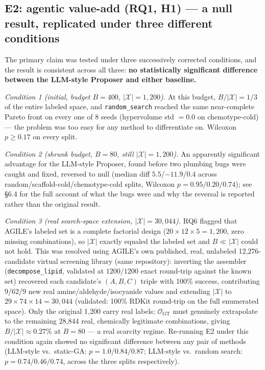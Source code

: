 \documentclass{article}
\begin{document}
\subsection{E2: agentic value-add (RQ1, H1) --- a null result, replicated
under three different conditions}

The primary claim was tested under three successively corrected
conditions, and the result is consistent across all three: \textbf{no
statistically significant difference between the LLM-style Proposer and
either baseline.}

\emph{Condition 1 (initial, budget $B=400$, $|\mathcal{X}|=1{,}200$).} At
this budget, $B/|\mathcal{X}| = 1/3$ of the entire labeled space, and
\texttt{random\_search} reached the same near-complete Pareto front on
every one of 8 seeds (hypervolume std $= 0.0$ on chemotype-cold) --- the
problem was too easy for any method to differentiate on. Wilcoxon $p \ge
0.17$ on every split.

\emph{Condition 2 (shrunk budget, $B=80$, still $|\mathcal{X}|=1{,}200$).}
An apparently significant advantage for the LLM-style Proposer, found
before two plumbing bugs were caught and fixed, reversed to null (median
diff $5.5$/$-11.9$/$0.4$ across random/scaffold-cold/chemotype-cold
splits, Wilcoxon $p=0.95/0.20/0.74$); see \S6.4 for the full account of
what the bugs were and why the reversal is reported rather than the
original result.

\emph{Condition 3 (real search-space extension, $|\mathcal{X}| =
30{,}044$).} RQ6 flagged that AGILE's labeled set is a complete factorial
design ($20\times12\times5=1{,}200$, zero missing combinations), so
$|\mathcal{X}|$ exactly equaled the labeled set and $B \ll |\mathcal{X}|$
could not hold. This was resolved using AGILE's own published, real,
unlabeled 12,276-candidate virtual screening library (same repository):
inverting the assembler (\texttt{decompose\_lipid}, validated at
$1200/1200$ exact round-trip against the known set) recovered each
candidate's $(A,B,C)$ triple with 100\% success, contributing 9/62/9 new
real amine/aldehyde/isocyanide values and extending $|\mathcal{X}|$ to
$29\times74\times14=30{,}044$ (validated: 100\% RDKit round-trip on the
full enumerated space). Only the original 1,200 carry real labels;
$\mathcal{O}_{\text{GT}}$ must genuinely extrapolate to the remaining
28,844 real, chemically legitimate combinations, giving $B/|\mathcal{X}|
\approx 0.27\%$ at $B=80$ --- a real scarcity regime. Re-running E2 under
this condition again showed no significant difference between any pair of
methods (LLM-style vs.\ static-GA: $p = 1.0/0.84/0.87$; LLM-style vs.\
random search: $p=0.74/0.46/0.74$, across the three splits respectively).
\end{document}
